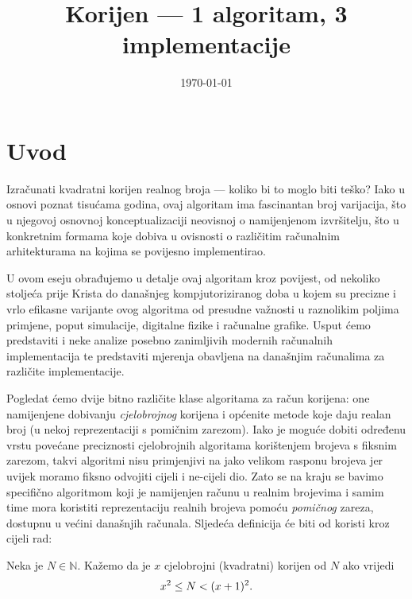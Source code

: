 \documentclass[12pt]{scrartcl}
\title{Korijen --- 1 algoritam, 3 implementacije}
\date{\today}
\begin{document}
\maketitle
\tableofcontents
\pagebreak

\section{Uvod}
Izračunati kvadratni korijen realnog broja --- koliko bi to moglo biti teško? Iako u osnovi poznat tisućama godina,
ovaj algoritam ima fascinantan broj varijacija, što u njegovoj osnovnoj konceptualizaciji neovisnoj o namijenjenom izvršitelju, što u konkretnim
formama koje dobiva u ovisnosti o različitim računalnim arhitekturama na kojima se povijesno implementirao.

U ovom eseju obrađujemo u detalje ovaj algoritam kroz povijest, od nekoliko stoljeća prije Krista
do današnjeg kompjutoriziranog doba u kojem su precizne i vrlo efikasne varijante
ovog algoritma od presudne važnosti u raznolikim poljima primjene, poput simulacije, digitalne fizike i računalne grafike. Usput ćemo predstaviti
i neke analize posebno zanimljivih modernih računalnih implementacija te predstaviti mjerenja obavljena na današnjim računalima za različite implementacije.

Pogledat ćemo dvije bitno različite klase algoritama za račun korijena: one namijenjene dobivanju \emph{cjelobrojnog} korijena i općenite
metode koje daju realan broj (u nekoj reprezentaciji s pomičnim zarezom). Iako je moguće dobiti određenu vrstu povećane preciznosti
cjelobrojnih algoritama korištenjem brojeva s fiksnim zarezom, takvi algoritmi nisu primjenjivi na jako velikom rasponu brojeva jer uvijek moramo
fiksno odvojiti cijeli i ne-cijeli dio. Zato se na kraju se bavimo specifično algoritmom koji je namijenjen računu u realnim
brojevima i samim time mora koristiti reprezentaciju realnih brojeva pomoću \emph{pomičnog} zareza, dostupnu u većini današnjih računala.
Sljedeća definicija će biti od koristi kroz cijeli rad:
\begin{definicija}
    Neka je $N\in\mathbb{N}$. Kažemo da je $x$ cjelobrojni (kvadratni) korijen od $N$ ako vrijedi
    \begin{equation*}
        x^2 \leq N < (x+1)^2\text.
    \end{equation*}
\end{definicija}
\end{document}
